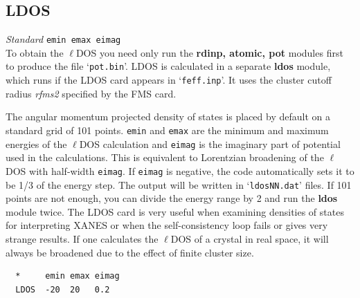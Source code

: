 \documentclass[11pt,oneside]{report} %
\newenvironment{Card}[4]%
      {\vspace{3ex}%
        \subsection{#1}
        \quad\textsl{#3}\newline
        \quad\texttt{#2}\newline%
        \label{card:#4}\\}
      {}
\newcommand{\file}[1]{`\texttt{#1}'}
\newcommand{\module}[1]{\textrm{\bf{#1}}}
\begin{document}
\begin{Card}{LDOS}{emin   emax   eimag}{Standard}{ldo}
  To obtain the $\ell$DOS you need only run the \module{rdinp, atomic, pot} modules first 
  to produce the file \file{pot.bin}.
  LDOS is calculated in a separate \module{ldos} module, which runs  
  if the LDOS card appears in \file{feff.inp}.  It uses the cluster cutoff radius \textit{rfms2} specified
  by the FMS card.

  The angular momentum projected density of states is placed by
  default on a standard grid of 101 points. \texttt{emin} and
  \texttt{emax} are the minimum and maximum energies of the $\ell$DOS
  calculation and \texttt{eimag} is the imaginary part of potential
  used in the calculations. This is equivalent to Lorentzian broadening 
  of the $\ell$DOS with half-width \texttt{eimag}. If \texttt{eimag} 
  is negative, the code automatically sets it to be 1/3 of the energy 
  step. The output will be written in \file{ldosNN.dat} files. 
  If 101 points are not
  enough, you can divide the energy range by 2 and run the \module{ldos} module twice.
  The LDOS card is very useful when examining densities of states for
  interpreting XANES or when the self-consistency loop fails or gives
  very strange results. If one calculates the $\ell$DOS of a crystal in real space, it will always
  be broadened due to the effect of finite cluster size.
\begin{verbatim}
  *     emin emax eimag
  LDOS  -20  20   0.2
\end{verbatim}
\end{Card}
\end{document}

